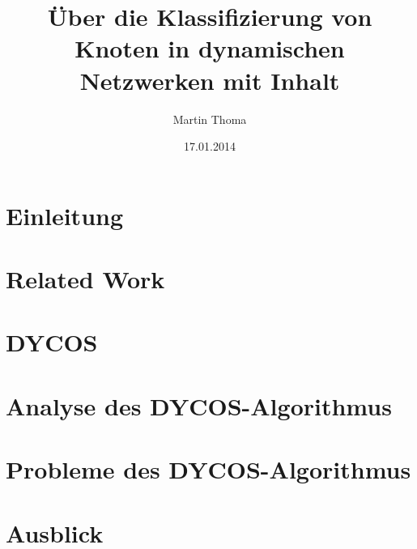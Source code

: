 \documentclass[technote,a4paper,leqno]{IEEEtran}
\begin{document}
\title{Über die Klassifizierung von Knoten in dynamischen Netzwerken mit Inhalt}
\author{Martin Thoma}
\date{17.01.2014}
\maketitle

\begin{abstract}%

\end{abstract}

\section{Einleitung}


\section{Related Work}


\section{DYCOS}


\section{Analyse des DYCOS-Algorithmus}


\section{Probleme des DYCOS-Algorithmus}


\section{Ausblick}




\end{document}
